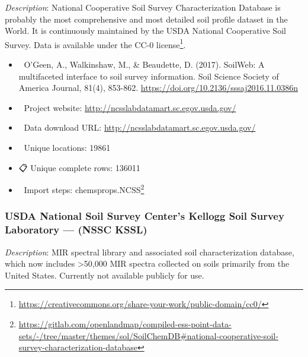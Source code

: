 \documentclass[
  graybox,natbib,nospthms]{svmono}
\providecommand{\tightlist}{%
  \setlength{\itemsep}{0pt}\setlength{\parskip}{0pt}}
\providecommand{\tightlist}{\setlength{\itemsep}{0pt}\setlength{\parskip}{0pt}}
\renewcommand{\href}[2]{#2 (\url{#1})}
\renewcommand{\href}[2]{#2\footnote{\url{#1}}}
\begin{document}
\emph{Description}: National Cooperative Soil Survey Characterization Database is probably
the most comprehensive and most detailed soil profile dataset in the World. It is continuously
maintained by the USDA National Cooperative Soil Survey. Data is available under the
\href{https://creativecommons.org/share-your-work/public-domain/cc0/}{CC-0 license}.

\begin{itemize}
\tightlist
\item
  📕 O'Geen, A., Walkinshaw, M., \& Beaudette, D. (2017). SoilWeb: A multifaceted interface to soil survey information. Soil Science Society of America Journal, 81(4), 853-862. \url{https://doi.org/10.2136/sssaj2016.11.0386n}\\
\item
  🔗 Project website: \url{http://ncsslabdatamart.sc.egov.usda.gov/}\\
\item
  📂 Data download URL: \url{http://ncsslabdatamart.sc.egov.usda.gov/}\\
\item
  📍 Unique locations: 19861\\
\item
  📋 Unique complete rows: 136011\\
\item
  📝 Import steps: \href{https://gitlab.com/openlandmap/compiled-ess-point-data-sets/-/tree/master/themes/sol/SoilChemDB\#national-cooperative-soil-survey-characterization-database}{chemsprops.NCSS}
\end{itemize}

\hypertarget{usda-national-soil-survey-centers-kellogg-soil-survey-laboratory-nssc-kssl}{%
\subsubsection{USDA National Soil Survey Center's Kellogg Soil Survey Laboratory --- (NSSC KSSL)}\label{usda-national-soil-survey-centers-kellogg-soil-survey-laboratory-nssc-kssl}}

\emph{Description}: MIR spectral library and associated soil characterization database, which now
includes \textgreater50,000 MIR spectra collected on soils primarily from the United States. Currently not available publicly for use.
\end{document}
